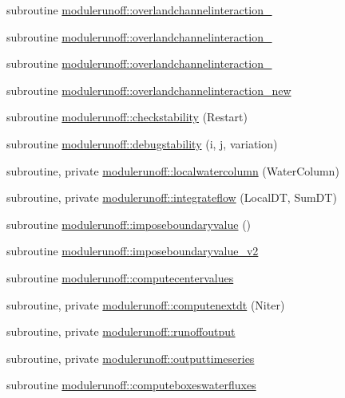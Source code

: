 \begin{DoxyCompactItemize}
\item 
subroutine \mbox{\hyperlink{namespacemodulerunoff_af059c1ee46f4d88ba5904020c0d1edfd}{modulerunoff\+::overlandchannelinteraction\+\_}}
\item 
subroutine \mbox{\hyperlink{namespacemodulerunoff_add510de98548d322d9084c2782b07388}{modulerunoff\+::overlandchannelinteraction\+\_}}
\item 
subroutine \mbox{\hyperlink{namespacemodulerunoff_a5389b89d2ccfe710976c31b556113eca}{modulerunoff\+::overlandchannelinteraction\+\_}}
\item 
subroutine \mbox{\hyperlink{namespacemodulerunoff_a03f16d8e0cac2434944d8e8ac46db4c2}{modulerunoff\+::overlandchannelinteraction\+\_\+new}}
\item 
subroutine \mbox{\hyperlink{namespacemodulerunoff_a330dcdf852e8d32ad8f61027fca5572d}{modulerunoff\+::checkstability}} (Restart)
\item 
subroutine \mbox{\hyperlink{namespacemodulerunoff_ad470166654c51ff37fe83cafeef5a424}{modulerunoff\+::debugstability}} (i, j, variation)
\item 
subroutine, private \mbox{\hyperlink{namespacemodulerunoff_abd7df3c244fbd0c4171c796df0f50906}{modulerunoff\+::localwatercolumn}} (Water\+Column)
\item 
subroutine, private \mbox{\hyperlink{namespacemodulerunoff_ad94c220c4dbba10ee5046785e9e782e9}{modulerunoff\+::integrateflow}} (Local\+DT, Sum\+DT)
\item 
subroutine \mbox{\hyperlink{namespacemodulerunoff_a994fa95e6648fa412fa3e0982c2953e3}{modulerunoff\+::imposeboundaryvalue}} ()
\item 
subroutine \mbox{\hyperlink{namespacemodulerunoff_acf9771f898b15e849b1eaba077dd0d83}{modulerunoff\+::imposeboundaryvalue\+\_\+v2}}
\item 
subroutine \mbox{\hyperlink{namespacemodulerunoff_a922ce27a6758e75221357b9572099e5a}{modulerunoff\+::computecentervalues}}
\item 
subroutine, private \mbox{\hyperlink{namespacemodulerunoff_a7e93c436177a4089e806a4f1fdeedc77}{modulerunoff\+::computenextdt}} (Niter)
\item 
subroutine, private \mbox{\hyperlink{namespacemodulerunoff_af0c6bd2433c33b62204214405fa2bd23}{modulerunoff\+::runoffoutput}}
\item 
subroutine, private \mbox{\hyperlink{namespacemodulerunoff_aaf5ac22ae6531f74c06c4596a878eaf9}{modulerunoff\+::outputtimeseries}}
\item 
subroutine \mbox{\hyperlink{namespacemodulerunoff_a88ccc0aaa3ecf729db168b684f5b4801}{modulerunoff\+::computeboxeswaterfluxes}}

\end{DoxyCompactItemize}
